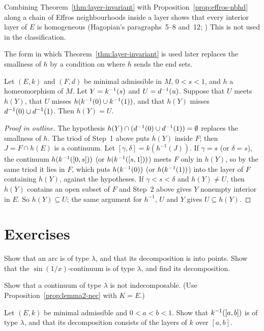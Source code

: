 \begin{remark}
Combining Theorem~\ref{thm:layer-invariant} with Proposition~\ref{prop:effros-nbhd} along a chain of Effros
neighbourhoods inside a layer shows that every interior layer of $E$ is homogeneous (Hagopian's paragraphs~5--8 and~12;
) This is not used
in the classification.
\end{remark}

The form in which Theorem~\ref{thm:layer-invariant} is used later replaces the smallness of $h$ by a condition on
where $h$ sends the end sets.

\begin{theorem}\label{thm:h76-lemma3}
Let $(E,k)$ and $(F,d)$ be minimal admissible in $M$, $0<s<1$, and $h$ a homeomorphism of $M$. Let $Y=k^{-1}(s)$ and $U=d^{-1}(u)$. Suppose that $U$ meets $h(Y)$, that $U$ misses $h(k^{-1}(0)\cup k^{-1}(1))$, and that $h(Y)$ misses $d^{-1}(0)\cup d^{-1}(1)$. Then
$h(Y)=U$.
\end{theorem}

\begin{proof}[Proof in outline]
The hypothesis $h(Y)\cap(d^{-1}(0)\cup d^{-1}(1))=\emptyset$ replaces the smallness of $h$. The triod of Step~1 above puts $h(Y)$
inside $F$; then $J=F\cap h(E)$ is a continuum. Let $[\gamma,\delta]=k(h^{-1}(J))$. If $\gamma=s$ (or $\delta=s$), the continuum
$h(k^{-1}([0,s]))$ (or $h(k^{-1}([s,1]))$) meets $F$ only in $h(Y)$, so by the same triod it lies in $F$, which puts $h(k^{-1}(0))$ (or $h(k^{-1}(1))$) into the layer of $F$ containing $h(Y)$, against the hypotheses. If $\gamma<s<\delta$ and $h(Y)\ne U$,
then $h(Y)$ contains an open subset of $F$ and Step~2 above gives $Y$ nonempty interior in $E$. So $h(Y)\subseteq U$; the same
argument for $h^{-1}$, $U$ and $Y$ gives $U\subseteq h(Y)$.
\end{proof}


\section*{Exercises}

\begin{exercise}
Show that an arc is of type $\lambda$, and that its decomposition is into points. Show that the
$\sin(1/x)$-continuum is of type $\lambda$, and find its decomposition.
\end{exercise}

\begin{exercise}
Show that a continuum of type $\lambda$ is not indecomposable. (Use Proposition~\ref{prop:lemma2-nec} with $K=E$.)
\end{exercise}

\begin{exercise}
Let $(E,k)$ be minimal admissible and $0<a<b<1$. Show that $k^{-1}([a,b])$ is of type $\lambda$, and that its decomposition
consists of the layers of $k$ over $[a,b]$.
\end{exercise}
